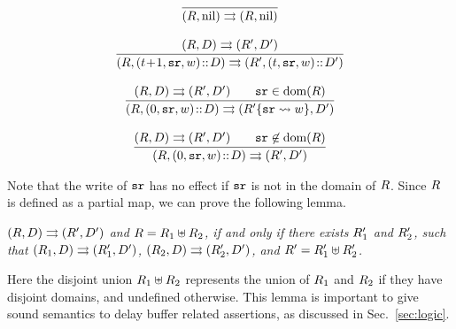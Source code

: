 {\small
$$
\begin{array}{c}
\infer
{\Dstep{(\RFile, \nil)}{(\RFile,\nil)}}
{}
\\
\\
%
%
\infer
{\Dstep{(\RFile, (\tick\!+\!1, \sr, \word)\dbCons\DBuf)}
       {(\RFile', (\tick, \sr, \word)\dbCons\DBuf')}}
{\Dstep{(\RFile, \DBuf)}{(\RFile', \DBuf')}}
\\
\\
\infer
{\Dstep{(\RFile, (0, \sr, \word)\dbCons\DBuf)}{(\fsubst{\RFile'}\sr\word, \DBuf')}}
{\Dstep{(\RFile, \DBuf)}{(\RFile', \DBuf')}
\qquad \sr\in\dom(\RFile)
}
%
\\
\\
%
\infer
{\Dstep{(\RFile, (0, \sr, \word)\dbCons\DBuf)}{(\RFile', \DBuf')}}
{\Dstep{(\RFile, \DBuf)}{(\RFile', \DBuf')}
 \qquad \sr\not\in\dom(\RFile)
}
\end{array}
$$
}

Note that the write of $\texttt{sr}$ has no effect if $\texttt{sr}$ is not
in the domain of $R$. Since $R$ is defined as a partial
map, we can prove the following lemma.
\begin{lemma}
    \em
	\label{lemma:RFileSplitExDelay}
	${(R, D)}\rightrightarrows{(R', D')}$
    and $R = R_1 \uplus R_2$,
    if and only if
    there exists $R_1'$ and $R_2'$, such that
    ${(R_1, D)}\rightrightarrows{(R_1', D')}$, ${(R_2, D)}\rightrightarrows{(R_2', D')}$,
    and $R' = R_1' \uplus R_2'$.
\end{lemma}
Here the disjoint union $R_1 \uplus R_2$ represents the union of
$R_1$ and $R_2$ if they have disjoint domains, and undefined
otherwise. This lemma is important to give sound semantics
to delay buffer related assertions, as discussed in
Sec.~\ref{sec:logic}.



